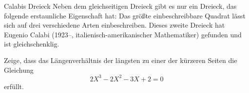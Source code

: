 \documentclass{algblatt}
\begin{document}
\begin{aufgabe}{Calabis Dreieck}
Neben dem gleichseitigen Dreieck gibt es nur ein Dreieck, das folgende erstaunliche
Eigenschaft hat: Das größte 
einbeschreibbare Quadrat lässt sich auf drei verschiedene Arten einbeschreiben.
Dieses zweite Dreieck hat Eugenio Calabi (1923--, italienisch-amerikanischer
Mathematiker) gefunden und ist gleichschenklig.

Zeige, dass das Längenverhältnis der längsten zu einer der kürzeren Seiten die
Gleichung
\[ 2 X^3 - 2 X^2 - 3 X + 2 = 0 \]
erfüllt. \\[1em]

\begin{center}
  \scalebox{0.5}{}
\end{center}
\end{aufgabe}
\end{document}
